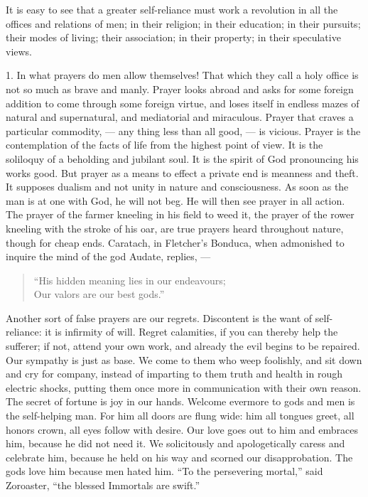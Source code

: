 \documentclass{article}
\begin{document}
It is easy to see that a greater self-reliance must work a revolution in all
the offices and relations of men; in their religion; in their education; in
their pursuits; their modes of living; their association; in their property;
in their speculative views.

1. In what prayers do men allow themselves! That which they call a holy
office is not so much as brave and manly. Prayer looks abroad and asks for
some foreign addition to come through some foreign virtue, and loses itself
in endless mazes of natural and supernatural, and mediatorial and
miraculous. Prayer that craves a particular commodity, --- any thing less
than all good, --- is vicious. Prayer is the contemplation of the facts of
life from the highest point of view. It is the soliloquy of a beholding and
jubilant soul. It is the spirit of God pronouncing his works good. But
prayer as a means to effect a private end is meanness and theft. It supposes
dualism and not unity in nature and consciousness. As soon as the man is at
one with God, he will not beg. He will then see prayer in all action. The
prayer of the farmer kneeling in his field to weed it, the prayer of the
rower kneeling with the stroke of his oar, are true prayers heard throughout
nature, though for cheap ends. Caratach, in Fletcher's Bonduca, when
admonished to inquire the mind of the god Audate, replies, ---

\begin{verse}
``His hidden meaning lies in our endeavours;\\
Our valors are our best gods.''
\end{verse}

Another sort of false prayers are our regrets. Discontent is the want of
self-reliance: it is infirmity of will. Regret calamities, if you can
thereby help the sufferer; if not, attend your own work, and already the
evil begins to be repaired. Our sympathy is just as base. We come to them
who weep foolishly, and sit down and cry for company, instead of imparting
to them truth and health in rough electric shocks, putting them once more in
communication with their own reason. The secret of fortune is joy in our
hands. Welcome evermore to gods and men is the self-helping man. For him all
doors are flung wide: him all tongues greet, all honors crown, all eyes
follow with desire. Our love goes out to him and embraces him, because he
did not need it. We solicitously and apologetically caress and celebrate
him, because he held on his way and scorned our disapprobation. The gods
love him because men hated him. ``To the persevering mortal,'' said Zoroaster,
``the blessed Immortals are swift.''
\end{document}
